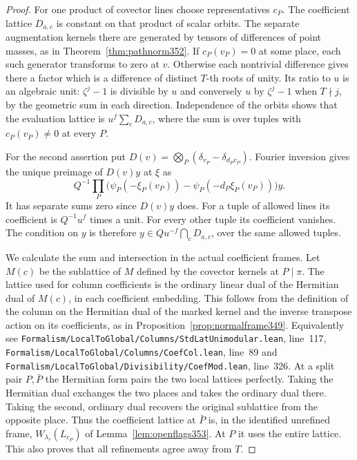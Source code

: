 \documentclass[a4paper,11pt]{article}
\theoremstyle{definition}
\theoremstyle{remark}
\newcommand{\srcloc}[2]{{\small\nolinkurl{#1.lean}}, line~#2}
\numberwithin{equation}{section}
\begin{document}
\begin{proof}
For one product of covector lines choose representatives \(c_P\).
The coefficient lattice \(D_{a,c}\) is constant on that product
of scalar orbits. The separate augmentation kernels there
are generated by tensors of differences of point masses, as in
Theorem~\ref{thm:pathnorm352}. If \(c_P(v_P)=0\) at some place,
each such generator transforms to zero at \(v\). Otherwise
each nontrivial difference gives there a factor which is a
difference of distinct \(T\)-th roots of unity. Its ratio to
\(u\) is an algebraic unit: \(\zeta^j-1\) is divisible by \(u\)
and conversely \(u\) by \(\zeta^j-1\) when \(T\nmid j\), by
the geometric sum in each direction. Independence of the
orbits shows that the evaluation lattice is \(u^f\sum_cD_{a,c}\),
where the sum is over tuples with \(c_P(v_P)\ne0\) at every \(P\).

For the second assertion put \(D(v)=\bigotimes_P
(\delta_{v_P}-\delta_{d_Pv_P})\). Fourier inversion gives
the unique preimage of \(D(v)y\) at \(\xi\) as
\[
   Q^{-1}\prod_P
       \big(\psi_P(-\xi_P(v_P))-\psi_P(-d_P\xi_P(v_P))\big)y.
\]
It has separate sums zero since \(D(v)y\) does. For a tuple
of allowed lines its coefficient is \(Q^{-1}u^f\) times a
unit. For every other tuple its coefficient vanishes.
The condition on \(y\) is therefore \(y\in Q u^{-f}\bigcap_cD_{a,c}\),
over the same allowed tuples.

We calculate the sum and intersection in the actual coefficient
frames. Let \(M(c)\) be the sublattice of \(M\) defined by the
covector kernels at \(P\mid\pi\). The lattice used for column
coefficients is the ordinary linear dual of the Hermitian dual of
\(M(c)\), in each coefficient embedding. This follows from the
definition of the column on the Hermitian dual of the marked
kernel and the inverse transpose action on its coefficients, as
in Proposition~\ref{prop:normalframe349}. Equivalently see
\srcloc{Formalism/LocalToGlobal/Columns/StdLatUnimodular}{117},
\srcloc{Formalism/LocalToGlobal/Columns/CoefCol}{89} and
\srcloc{Formalism/LocalToGlobal/Divisibility/CoefMod}{326}.
At a split pair \(P,\bar P\) the Hermitian form pairs the two
local lattices perfectly. Taking the Hermitian dual exchanges
the two places and takes the ordinary dual there. Taking the
second, ordinary dual recovers the original sublattice from
the opposite place. Thus the coefficient lattice at \(\bar P\)
is, in the identified unrefined frame, \(W_{\lambda_\tau}(L_{c_P})\)
of Lemma~\ref{lem:openflags353}. At \(P\) it uses the entire
lattice. This also proves that all refinements agree away from \(T\).


\end{proof}
\end{document}
